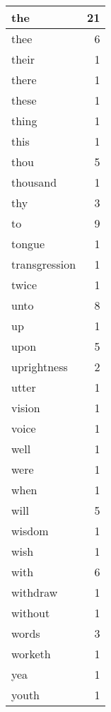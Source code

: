 \begin{center}
\begin{longtable}{l|r}
the & 21 \\ \hline
thee & 6 \\ \hline
their & 1 \\ \hline
there & 1 \\ \hline
these & 1 \\ \hline
thing & 1 \\ \hline
this & 1 \\ \hline
thou & 5 \\ \hline
thousand & 1 \\ \hline
thy & 3 \\ \hline
to & 9 \\ \hline
tongue & 1 \\ \hline
transgression & 1 \\ \hline
twice & 1 \\ \hline
unto & 8 \\ \hline
up & 1 \\ \hline
upon & 5 \\ \hline
uprightness & 2 \\ \hline
utter & 1 \\ \hline
vision & 1 \\ \hline
voice & 1 \\ \hline
well & 1 \\ \hline
were & 1 \\ \hline
when & 1 \\ \hline
will & 5 \\ \hline
wisdom & 1 \\ \hline
wish & 1 \\ \hline
with & 6 \\ \hline
withdraw & 1 \\ \hline
without & 1 \\ \hline
words & 3 \\ \hline
worketh & 1 \\ \hline
yea & 1 \\ \hline
youth & 1 \\ \hline
\end{longtable}
\end{center}



\normalsize



